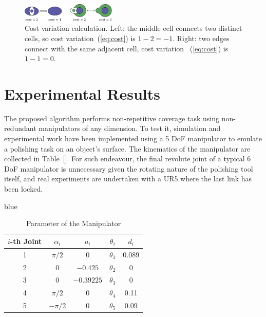 \documentclass[journal]{IEEEtran}
\begin{document}
\begin{figure}[t]
\centering
\includegraphics[width = 0.4\textwidth]{figures/proof/costcal}
\caption{Cost variation calculation. Left: the middle cell connects two distinct cells, so cost variation~(\ref{eq:cost}) is $1-2 = -1$. 
Right: two edges connect with the same adjacent cell, cost variation ~(\ref{eq:cost}) is $1-1 = 0$.} %
\label{figcost}
\end{figure}


\section{Experimental Results}
\label{sectionexperiment}
The proposed algorithm performs non-repetitive coverage task using non-redundant 
manipulators of any dimension. 
To test it, simulation and experimental work have been implemented using a 5 DoF manipulator to emulate a polishing task on an object's surface. The kinematics of the manipulator are collected in Table~\ref{}.
For such endeavour, the final revolute joint of a typical 6 DoF manipulator is unnecessary given the rotating nature of the polishing tool itself, 
and real experiments are undertaken with a UR5 where the last link has been locked.
\begin{color}{blue}
\begin{table}[tb]
\centering
\caption{Parameter of the Manipulator}
\begin{tabular}{|c|c|c|c|c|}
\hline
$i$-th Joint & $\alpha_i$ & $a_i$ & $\theta_i$ & $d_i$ \\
\hline
\hline
1 & $\pi/2$ & 0 & $\theta_1$ & 0.089 \\
\hline
2 & 0 & $-0.425$ & $\theta_2$ & 0 \\
\hline
3 & 0 & $-0.39225$ & $\theta_3$ & 0 \\
\hline
4 & $\pi/2$ & $0$ & $\theta_4$ & 0.11 \\
\hline
5 & $-\pi/2$ & 0 & $\theta_5$ & 0.09 \\
\hline
\end{tabular}

\end{table}
\end{color}
\end{document}
